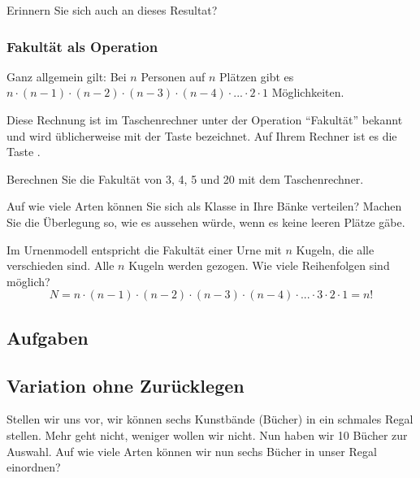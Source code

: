 Erinnern Sie sich auch an dieses Resultat? 


\newpage

\subsubsection{Fakultät als Operation}
Ganz allgemein gilt: Bei $n$ Personen auf $n$ Plätzen gibt es
$n\cdot{} (n-1) \cdot{} (n-2) \cdot{} (n-3) \cdot{} (n-4) \cdot{}
... \cdot{} 2 \cdot{} 1$ Möglichkeiten.

Diese Rechnung ist im Taschenrechner unter der Operation ``Fakultät''
bekannt und wird üblicherweise mit der Taste  bezeichnet. Auf
Ihrem Rechner ist es die Taste .

Berechnen Sie die Fakultät von 3, 4, 5 und 20 mit dem Taschenrechner.


Auf wie viele Arten können Sie sich als Klasse in Ihre Bänke
verteilen? Machen Sie die Überlegung so, wie es aussehen würde, wenn es keine leeren Plätze gäbe.


\begin{gesetz}{}{}
Im Urnenmodell entspricht die Fakultät einer Urne mit $n$ Kugeln, die
alle verschieden sind. Alle $n$ Kugeln werden gezogen. Wie viele
Reihenfolgen sind möglich?
$$N = n\cdot{} (n-1) \cdot{} (n-2) \cdot{} (n-3) \cdot{}
(n-4) \cdot{} ... \cdot{} 3\cdot{} 2 \cdot{} 1 = n!$$
\end{gesetz}

\subsection*{Aufgaben}
\newpage


\subsection{Variation ohne Zurücklegen}
Stellen wir uns vor, wir können sechs Kunstbände (Bücher) in ein schmales
Regal stellen. Mehr geht nicht, weniger wollen wir nicht.
Nun haben wir 10 Bücher zur Auswahl. Auf wie viele Arten können wir nun sechs Bücher in unser Regal einordnen?

